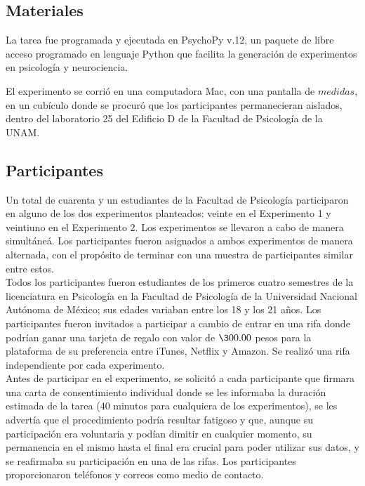 \subsection{Materiales}

La tarea fue programada y ejecutada en PsychoPy v.12, un paquete de libre acceso programado en lenguaje Python que facilita la generación de experimentos en psicología y neurociencia.

El experimento se corrió en una computadora Mac, con una pantalla de $medidas$, en un cubículo donde se procuró que los participantes permanecieran aislados, dentro del laboratorio 25 del Edificio D de la Facultad de Psicología de la UNAM.

\subsection{Participantes}

Un total de cuarenta y un estudiantes de la Facultad de Psicología participaron en alguno de los dos experimentos planteados: veinte en el Experimento 1 y veintiuno en el Experimento 2. Los experimentos se llevaron a cabo de manera simultáneá. Los participantes fueron asignados a ambos experimentos de manera alternada, con el propósito de terminar con una muestra de participantes similar entre estos.\\

Todos los participantes fueron estudiantes de los primeros cuatro semestres de la licenciatura en Psicología en la Facultad de Psicología de la Universidad Nacional Autónoma de México; sus edades variaban entre los 18 y los 21 años. Los participantes fueron invitados a participar a cambio de entrar en una rifa donde podrían ganar una tarjeta de regalo con valor de $\300.00$ pesos para la plataforma de su preferencia entre iTunes, Netflix y Amazon. Se realizó una rifa independiente por cada experimento.\\ 

Antes de participar en el experimento, se solicitó a cada participante que firmara una carta de consentimiento individual donde se les informaba la duración estimada de la tarea (40 minutos para cualquiera de los experimentos), se les advertía que el procedimiento podría resultar fatigoso y que, aunque su participación era voluntaria y podían dimitir en cualquier momento, su permanencia en el mismo hasta el final era crucial para poder utilizar sus datos, y se reafirmaba su participación en una de las rifas. Los participantes proporcionaron teléfonos y correos como medio de contacto.\\

